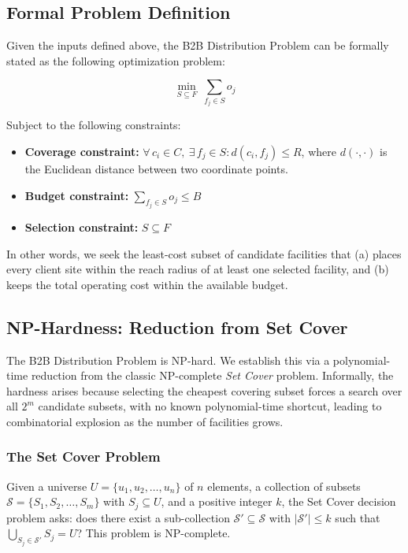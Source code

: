 \documentclass[letterpaper]{article}
\begin{document}
\subsection{Formal Problem Definition}
Given the inputs defined above, the B2B Distribution Problem can be formally stated as the following optimization problem:

\[
    \min_{S \subseteq F}\ \sum_{f_j \in S} o_j
\]

Subject to the following constraints:
\begin{itemize}
    \item \textbf{Coverage constraint:} $\forall\, c_i \in C,\ \exists\, f_j \in S : d(c_i, f_j) \leq R$, where $d(\cdot,\cdot)$ is the Euclidean distance between two coordinate points.
    \item \textbf{Budget constraint:} $\displaystyle\sum_{f_j \in S} o_j \leq B$
    \item \textbf{Selection constraint:} $S \subseteq F$
\end{itemize}

In other words, we seek the least-cost subset of candidate facilities that (a) places every client site within the reach radius of at least one selected facility, and (b) keeps the total operating cost within the available budget.

\subsection{NP-Hardness: Reduction from Set Cover}
The B2B Distribution Problem is NP-hard. We establish this via a polynomial-time reduction from the classic NP-complete \textit{Set Cover} problem. Informally, the hardness arises because selecting the cheapest covering subset forces a search over all $2^m$ candidate subsets, with no known polynomial-time shortcut, leading to combinatorial explosion as the number of facilities grows.

\subsubsection{The Set Cover Problem}
Given a universe $U = \{u_1, u_2, \ldots, u_n\}$ of $n$ elements, a collection of subsets $\mathcal{S} = \{S_1, S_2, \ldots, S_m\}$ with $S_j \subseteq U$, and a positive integer $k$, the Set Cover decision problem asks: does there exist a sub-collection $\mathcal{S}' \subseteq \mathcal{S}$ with $|\mathcal{S}'| \leq k$ such that $\bigcup_{S_j \in \mathcal{S}'} S_j = U$? This problem is NP-complete.
\end{document}
